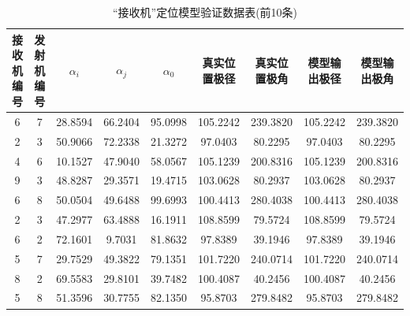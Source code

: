 \documentclass[withoutpreface,bwprint]{cumcmthesis}
\begin{document}
	\begin{table}[htbp!]
		\small
		\caption{“接收机”定位模型验证数据表(前10条)}
		\centering
		\tabcolsep=0.1cm
		\begin{tabular}{@{}ccccccccc@{}}
			\toprule
			\textbf{接收机编号} & \textbf{发射机编号} & \textbf{$\alpha_{i}$} & \textbf{$\alpha_{j}$} & \textbf{$\alpha_{0}$} & \textbf{真实位置极径} & \textbf{真实位置极角} & \textbf{模型输出极径} & \textbf{模型输出极角} \\ \midrule
			6              & 7              & 28.8594     & 66.2404     & 95.0998     & 105.2242        & 239.3820        & 105.2242        & 239.3820        \\
			2              & 3              & 50.9066     & 72.2338     & 21.3272     & 97.0403         & 80.2295         & 97.0403         & 80.2295         \\
			4              & 6              & 10.1527     & 47.9040     & 58.0567     & 105.1239        & 200.8316        & 105.1239        & 200.8316        \\
			9              & 3              & 48.8287     & 29.3571     & 19.4715     & 103.0628        & 80.2937         & 103.0628        & 80.2937         \\
			6              & 8              & 50.0504     & 49.6488     & 99.6993     & 100.4413        & 280.4038        & 100.4413        & 280.4038        \\
			2              & 3              & 47.2977     & 63.4888     & 16.1911     & 108.8599        & 79.5724         & 108.8599        & 79.5724         \\
			6              & 2              & 72.1601     & 9.7031      & 81.8632     & 97.8389         & 39.1946         & 97.8389         & 39.1946         \\
			5              & 7              & 29.7529     & 49.3822     & 79.1351     & 101.7220        & 240.0714        & 101.7220        & 240.0714        \\
			8              & 2              & 69.5583     & 29.8101     & 39.7482     & 100.4087        & 40.2456         & 100.4087        & 40.2456         \\
			5              & 8              & 51.3596     & 30.7755     & 82.1350     & 95.8703         & 279.8482        & 95.8703         & 279.8482        \\ \bottomrule
		\end{tabular}
	\end{table}
	
\end{document}
